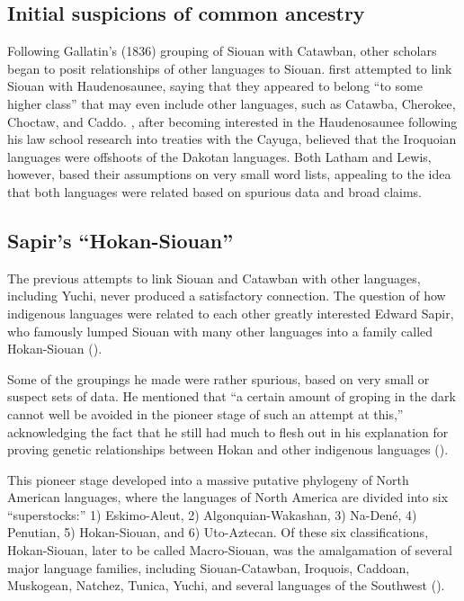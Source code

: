 \documentclass[output=paper]{LSP/langsci}
\begin{document}
\subsection{Initial suspicions of common ancestry}

Following Gallatin's (1836) grouping of Siouan with Catawban, other scholars began to posit relationships of other languages to Siouan. \citet{Latham1856} first attempted to link Siouan with Haudenosaunee, saying that they appeared to belong ``to some higher class'' that may even include other languages, such as Catawba, Cherokee, Choctaw, and Caddo. \citet{Lewis1871}, after becoming interested in the Haudenosaunee following his law school research into treaties with the Cayuga, believed that the Iroquoian languages were offshoots of the Dakotan languages. Both Latham and Lewis, however, based their assumptions on very small word lists, appealing to the idea that both languages were related based on spurious data and broad claims.

\subsection{Sapir's ``Hokan-Siouan''}

The previous attempts to link Siouan and Catawban with other languages, including Yuchi, never produced a satisfactory connection. The question of how indigenous languages were related to each other greatly interested Edward Sapir, who famously lumped Siouan with many other languages into a family called Hokan-Siouan (\citealt{Sapir1929}). 

Some of the groupings he made were rather spurious, based on very small or suspect sets of data. He mentioned that ``a certain amount of groping in the dark cannot well be avoided in the pioneer stage of such an attempt at this,'' acknowledging the fact that he still had much to flesh out in his explanation for proving genetic relationships between Hokan and other indigenous languages (\citealt[289]{Sapir1920}). 

This pioneer stage developed into a massive putative phylogeny of North American languages, where the languages of North America are divided into six ``superstocks:'' 1) Eskimo-Aleut, 2) Algonquian-Wakashan, 3) Na-Den\'e, 4) Penutian, 5) Hokan-Siouan, and 6) Uto-Aztecan. Of these six classifications, Hokan-Siouan, later to be called Macro-Siouan, was the amalgamation of several major language families, including Siouan-Catawban, Iroquois, Caddoan, Muskogean, Natchez, Tunica, Yuchi, and several languages of the Southwest (\citealt{Sapir1929}). 
\end{document}
